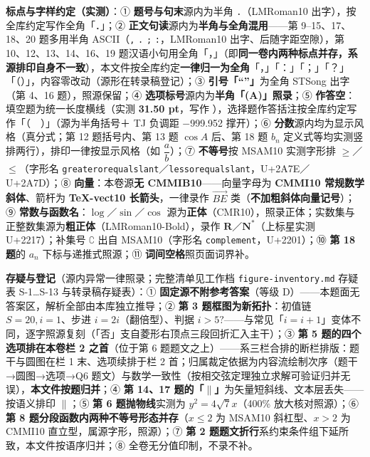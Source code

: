 \begin{gktip}
\textbf{标点与字样约定（实测）}：① \textbf{题号与句末}源内为半角 \texttt{.}（LMRoman10 出字），按全库约定写作全角「．」；② \textbf{正文句读}源内为\textbf{半角与全角混用}——第 9–15、17、18、20 题多用半角 ASCII（\texttt{,} \texttt{.} \texttt{;} \texttt{:}，LMRoman10 出字、后随字距空隙），第 10、12、13、14、16、19 题汉语小句用全角「，」（即\textbf{同一卷内两种标点并存，系源排印自身不一致}），本文件按全库约定\textbf{一律归一为全角}「，」「：」「；」「？」「（）」，内容零改动（源形在转录稿登记）；③ \textbf{引号「“”」}为全角 STSong 出字（第 4、16 题），照源保留；④ \textbf{选项标号}源内为\textbf{半角「(A)」照录}；⑤ \textbf{作答空}：填空题为统一长度横线（实测 \textbf{31.50 pt}，写作 \texttt{\gkblank{}}），选择题作答括注按全库约定写作「（　）」（源为半角括号＋ TJ 负调距 $-$999.952 撑开）；⑥ \textbf{分数}源内均为显示风格（真分式；第 12 题括号内、第 13 题 \(\cos A\) 后、第 18 题 \(b_n\) 定义式等均实测竖排两行），排印一律按显示风格（如 \(\dfrac{a}{b}\)）；⑦ \textbf{不等号}按 MSAM10 实测字形排 \(\geqslant\)／\(\leqslant\)（字形名 \texttt{greaterorequalslant}／\texttt{lessorequalslant}，U+2A7E／U+2A7D）；⑧ \textbf{向量}：本卷源\textbf{无 CMMIB10}——向量字母为 \textbf{CMMI10 常规数学斜体}、箭杆为 \textbf{TeX-vect10 长箭头}，一律录作 \(\overrightarrow{BE}\) 类（\textbf{不加粗斜体向量记号}）；⑨ \textbf{常数与函数名}：\(\log\)／\(\sin\)／\(\cos\) 源为\textbf{正体}（CMR10），照录正体；实数集与正整数集源为\textbf{粗正体}（LMRoman10-Bold），录作 \(\mathbf{R}\)／\(\mathbf{N}^{*}\)（上标星实测 U+2217）；补集号 \(\complement\) 出自 MSAM10（字形名 \texttt{complement}，U+2201）；⑩ \textbf{第 18 题}的 \(a_n\) 下标与递推式照源；⑪ \textbf{词间空格}照页面词界补。

\textbf{存疑与登记}（源内异常一律照录；完整清单见工作档 \texttt{figure-inventory.md} 存疑表 S-1…S-13 与转录稿存疑表）：① \textbf{固定源不附参考答案}（等级 D）——本题面无答案区，解析全部由本库独立推导；② \textbf{第 3 题框图为新拓扑}：初值链 \(S=20,i=1\)、步进 \(i=2i\)（翻倍型）、判据 \(i>5?\)——与常见「\(i=i+1\)」变体不同，逐字照源复刻（「否」支自菱形右顶点三段回折汇入主干）；③ \textbf{第 5 题的四个选项排在本卷栏 2 之首}（位于第 6 题题文之上）——系三栏合排的断栏排版：题干与圆图在栏 1 末、选项续排于栏 2 首；归属裁定依据为内容流绘制次序（题干→圆图→选项→Q6 题文）与数学一致性（按相交弦定理独立求解可验证归并无误），\textbf{本文件按题归并}；④ \textbf{第 14、17 题的「$\parallel$」}为矢量短斜线、文本层丢失——按语义排印 \(\parallel\)；⑤ \textbf{第 6 题抛物线}实测为 \(y^2=4\sqrt{7}x\)（400\% 放大核对照源）；⑥ \textbf{第 8 题分段函数内两种不等号形态并存}（\(x\leqslant2\) 为 MSAM10 斜杠型、\(x>2\) 为 CMMI10 直立型，属源字形，照源）；⑦ \textbf{第 2 题题文折行}系约束条件组下延所致，本文件按语序归并；⑧ 全卷无分值印制，不录不补。
\end{gktip}

